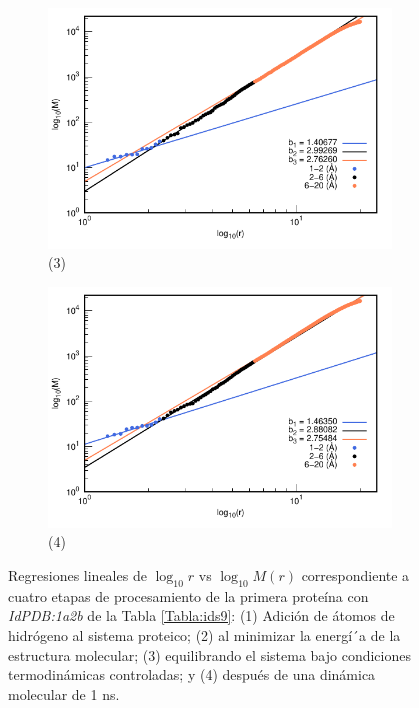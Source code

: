 \begin{figure}[H]
	\vspace{0cm} %
	
	\hspace{-0.3cm} 
	\begin{subfigure}{0.49\textwidth}
		\centering
		\includegraphics[width=\linewidth,page=1]{graphs/PDBs/1a2b/1a2bEq.pdf}
		\caption{(3)}
	\end{subfigure}
	\hspace{0.2cm}
	\begin{subfigure}{0.49\textwidth} %
		\centering
		\includegraphics[width=\linewidth,page=1]{graphs/PDBs/1a2b/1a2b1ns.pdf}
		\caption{(4)}
	\end{subfigure}
	
	\caption{
		Regresiones lineales de $\log_{10}r$ vs $\log_{10}M(r)$ correspondiente a cuatro etapas de procesamiento de la primera prote\'{i}na con \textit{IdPDB:1a2b} de la Tabla \ref{Tabla:ids9}: (1) Adici\'{o}n de \'{a}tomos de hidr\'{o}geno al sistema proteico; (2) al minimizar la energ\'{i´}a de la estructura molecular; (3) equilibrando el sistema bajo condiciones termodin\'{a}micas controladas; y (4) despu\'{e}s de una din\'{a}mica molecular de 1 ns.}
	\label{fig:1a2b}
\end{figure}


